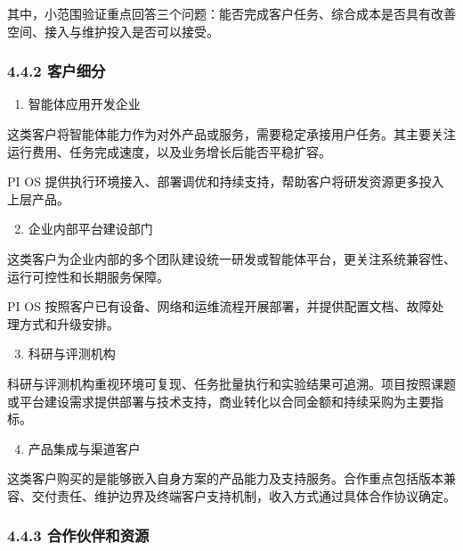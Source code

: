 其中，小范围验证重点回答三个问题：能否完成客户任务、综合成本是否具有改善空间、接入与维护投入是否可以接受。

\subsubsection{4.4.2 客户细分}\label{ux5ba2ux6237ux7ec6ux5206}

\begin{enumerate}

\item
  智能体应用开发企业
\end{enumerate}

这类客户将智能体能力作为对外产品或服务，需要稳定承接用户任务。其主要关注运行费用、任务完成速度，以及业务增长后能否平稳扩容。

PI OS 提供执行环境接入、部署调优和持续支持，帮助客户将研发资源更多投入上层产品。

\begin{enumerate}

\setcounter{enumi}{1}
\item
  企业内部平台建设部门
\end{enumerate}

这类客户为企业内部的多个团队建设统一研发或智能体平台，更关注系统兼容性、运行可控性和长期服务保障。

PI OS 按照客户已有设备、网络和运维流程开展部署，并提供配置文档、故障处理方式和升级安排。

\begin{enumerate}

\setcounter{enumi}{2}
\item
  科研与评测机构
\end{enumerate}

科研与评测机构重视环境可复现、任务批量执行和实验结果可追溯。项目按照课题或平台建设需求提供部署与技术支持，商业转化以合同金额和持续采购为主要指标。

\begin{enumerate}

\setcounter{enumi}{3}
\item
  产品集成与渠道客户
\end{enumerate}

这类客户购买的是能够嵌入自身方案的产品能力及支持服务。合作重点包括版本兼容、交付责任、维护边界及终端客户支持机制，收入方式通过具体合作协议确定。

\subsubsection{4.4.3 合作伙伴和资源}\label{ux5408ux4f5cux4f19ux4f34ux548cux8d44ux6e90}

